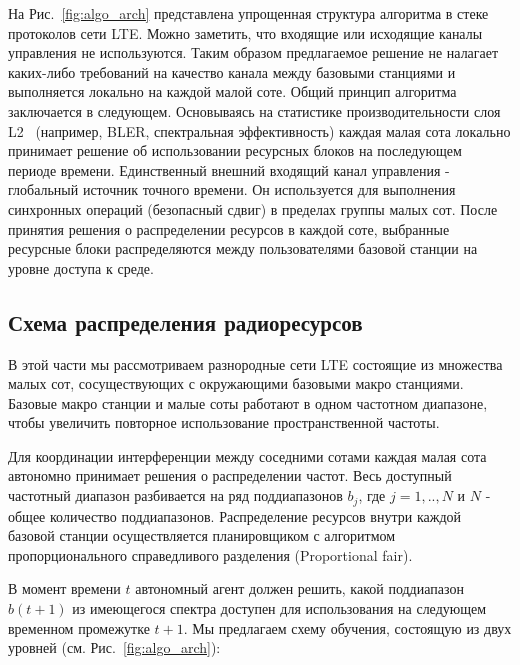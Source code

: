 На Рис.~\ref{fig:algo_arch} представлена упрощенная структура алгоритма в стеке протоколов сети LTE. Можно заметить, что входящие или исходящие каналы управления не используются. Таким образом предлагаемое решение не налагает каких-либо требований на качество канала между базовыми станциями и выполняется локально на каждой малой соте.
Общий принцип алгоритма заключается в следующем. Основываясь на статистике производительности слоя L2~\cite{TS36.300} (например, BLER, спектральная эффективность) каждая малая сота локально принимает решение об использовании ресурсных блоков на последующем периоде времени. Единственный внешний входящий канал управления - глобальный источник точного времени. Он используется для выполнения синхронных операций (безопасный сдвиг) в пределах группы малых сот. После принятия решения о распределении ресурсов в каждой соте, выбранные ресурсные блоки  распределяются между пользователями базовой станции на уровне доступа к среде.

\subsection{Схема распределения радиоресурсов}
В этой части мы рассмотриваем разнородные сети LTE состоящие из множества малых сот, сосуществующих с окружающими базовыми макро станциями. Базовые макро станции и малые соты работают в одном частотном диапазоне, чтобы увеличить повторное использование пространственной частоты.

Для координации интерференции между соседними сотами каждая малая сота автономно принимает решения о распределении частот. Весь доступный частотный диапазон разбивается на ряд поддиапазонов $b_{j}$, где $j=1, .., N$ и $N$ - общее количество поддиапазонов. Распределение ресурсов внутри каждой базовой станции осуществляется планировщиком с алгоритмом пропорционального справедливого разделения (Proportional fair).

В момент времени $t$ автономный агент должен решить, какой поддиапазон $b(t+1)$ из имеющегося спектра доступен для использования на следующем временном промежутке $t+1$. Мы предлагаем схему обучения, состоящую из двух уровней (см. Рис.~\ref{fig:algo_arch}):

